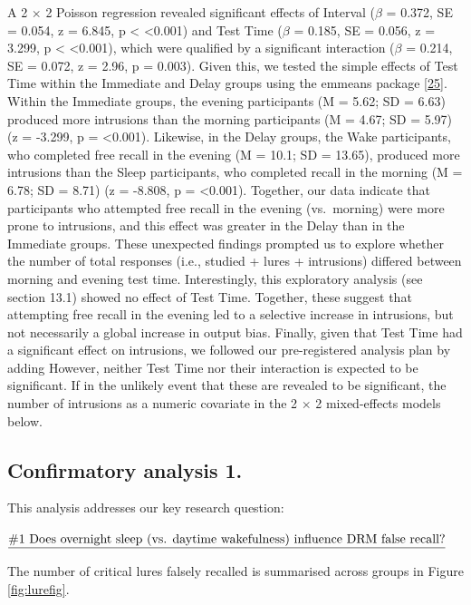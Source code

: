\documentclass[
]{article}
\begin{document}
A 2 \(\times\) 2 Poisson regression revealed significant effects of Interval (\(\beta\) = 0.372, SE = 0.054, z = 6.845, p \textless{} \textless0.001) and Test Time (\(\beta\) = 0.185, SE = 0.056, z = 3.299, p \textless{} \textless0.001), which were qualified by a significant interaction (\(\beta\) = 0.214, SE = 0.072, z = 2.96, p = 0.003). Given this, we tested the simple effects of Test Time within the Immediate and Delay groups using the emmeans package {[}\protect\hyperlink{ref-lenth2021a}{25}{]}. Within the Immediate groups, the evening participants (M = 5.62; SD = 6.63) produced more intrusions than the morning participants (M = 4.67; SD = 5.97) (z = -3.299, p = \textless0.001). Likewise, in the Delay groups, the Wake participants, who completed free recall in the evening (M = 10.1; SD = 13.65), produced more intrusions than the Sleep participants, who completed recall in the morning (M = 6.78; SD = 8.71) (z = -8.808, p = \textless0.001). Together, our data indicate that participants who attempted free recall in the evening (vs.~morning) were more prone to intrusions, and this effect was greater in the Delay than in the Immediate groups. These unexpected findings prompted us to explore whether the number of total responses (i.e., studied + lures + intrusions) differed between morning and evening test time. Interestingly, this exploratory analysis (see section 13.1) showed no effect of Test Time. Together, these suggest that attempting free recall in the evening led to a selective increase in intrusions, but not necessarily a global increase in output bias. Finally, given that Test Time had a significant effect on intrusions, we followed our pre-registered analysis plan by adding However, neither Test Time nor their interaction is expected to be significant. If in the unlikely event that these are revealed to be significant, the number of intrusions as a numeric covariate in the 2 \(\times\) 2 mixed-effects models below.

\hypertarget{confirmatory-analysis-1.}{%
\subsection{Confirmatory analysis 1.}\label{confirmatory-analysis-1.}}

This analysis addresses our key research question:

\(\text{\underline{\#1 Does overnight sleep (vs. daytime wakefulness) influence DRM false recall?}}\)

The number of critical lures falsely recalled is summarised across groups in Figure \ref{fig:lurefig}.
\end{document}
